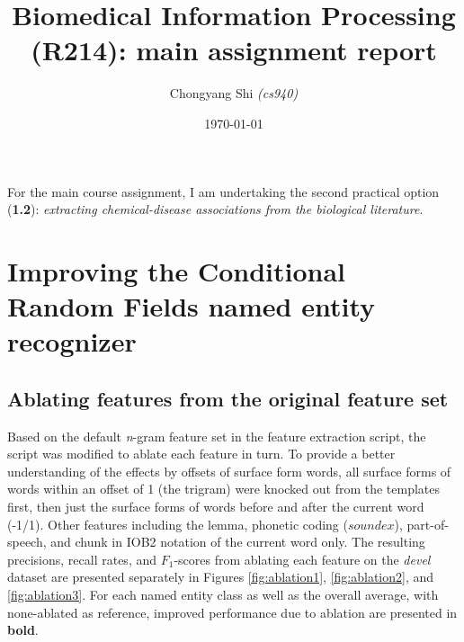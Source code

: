 \documentclass[10pt, oneside]{article}
\title{\vspace{-1cm}Biomedical Information Processing (R214): main assignment report}
\author{Chongyang Shi \emph{(cs940)}}
\date{\today}
\begin{document}
\maketitle

For the main course assignment, I am undertaking the second practical option (\textbf{1.2}): \emph{extracting chemical-disease associations from the biological literature}.

\section{Improving the Conditional Random Fields named entity recognizer}
\subsection{Ablating features from the original feature set} \label{subsec:ablating}

Based on the default \emph{n}-gram feature set in the feature extraction script, the script was modified to ablate each feature in turn. To provide a better understanding of the effects by offsets of surface form words, all surface forms of words within an offset of 1 (the trigram) were knocked out from the templates first, then just the surface forms of words before and after the current word (-1/1). Other features including the lemma, phonetic coding ($soundex$), part-of-speech, and chunk in IOB2 notation of the current word only. The resulting precisions, recall rates, and $F_1$-scores from ablating each feature on the \emph{devel} dataset are presented separately in Figures \ref{fig:ablation1}, \ref{fig:ablation2}, and \ref{fig:ablation3}. For each named entity class as well as the overall average, with none-ablated as reference, improved performance due to ablation are presented in \textbf{bold}.
\end{document}
